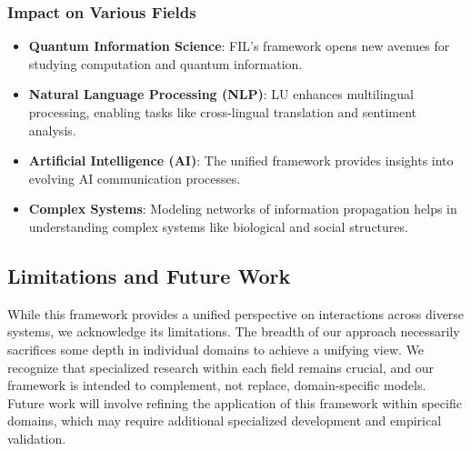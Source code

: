 \subsubsection{Impact on Various Fields}

\begin{itemize}
    \item \textbf{Quantum Information Science}: FIL's framework opens new avenues for studying computation and quantum information.
    \item \textbf{Natural Language Processing (NLP)}: LU enhances multilingual processing, enabling tasks like cross-lingual translation and sentiment analysis.
    \item \textbf{Artificial Intelligence (AI)}: The unified framework provides insights into evolving AI communication processes.
    \item \textbf{Complex Systems}: Modeling networks of information propagation helps in understanding complex systems like biological and social structures.
\end{itemize}

\subsection{Limitations and Future Work}

While this framework provides a unified perspective on interactions across diverse systems, we acknowledge its limitations. The breadth of our approach necessarily sacrifices some depth in individual domains to achieve a unifying view. We recognize that specialized research within each field remains crucial, and our framework is intended to complement, not replace, domain-specific models. Future work will involve refining the application of this framework within specific domains, which may require additional specialized development and empirical validation.

